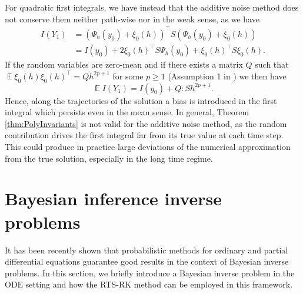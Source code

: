 \documentclass{siamart1116}
\numberwithin{theorem}{section}
\newcommand{\E}{\operatorname{\mathbb{E}}}
\begin{document}
For quadratic first integrals, we have instead that the additive noise method does not conserve them neither path-wise nor in the weak sense, as we have
\begin{equation}
\begin{aligned}
	I(Y_1) &= (\Psi_h(y_0) + \xi_0(h))^\top  S (\Psi_h(y_0) + \xi_0(h)) \\
	&= I(y_0) + 2\xi_0(h)^\top  S  \Psi_h(y_0) + \xi_0(h)^\top  S \xi_0(h).
\end{aligned}
\end{equation}
If the random variables are zero-mean and if there exists a matrix $Q$ such that $\E\xi_0(h)\xi_0(h)^\top  = Qh^{2p + 1}$ for some $p \geq 1$ (Assumption 1 in \cite{CGS16}) we then have
\begin{equation}\label{eq:BiasQuadraticAddNoise}
\E I(Y_1) = I(y_0) + Q : S h^{2p + 1}.
\end{equation}
Hence, along the trajectories of the solution a bias is introduced in the first integral which persists even in the mean sense. In general, Theorem \ref{thm:PolyInvariants} is not valid for the additive noise method, as the random contribution drives the first integral far from its true value at each time step. This could produce in practice large deviations of the numerical approximation from the true solution, especially in the long time regime.

\section{Bayesian inference inverse problems}\label{sec:BayesianInference} It has been recently shown \cite{CGS16, CCC16} that probabilistic methods for ordinary and partial differential equations guarantee good results in the context of Bayesian inverse problems. In this section, we briefly introduce a Bayesian inverse problem in the ODE setting and how the RTS-RK method can be employed in this framework. 
\end{document}
